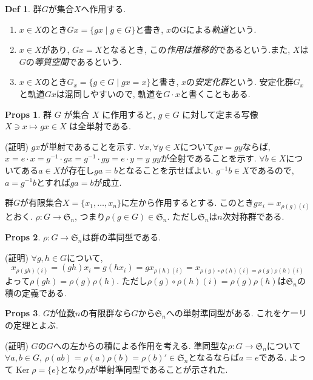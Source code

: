 \documentclass[dvipdfmx]{jsarticle}
\theoremstyle{definition}
\newtheorem{props}{Props}
\newtheorem{definition}{Def}
\numberwithin{equation}{section}
\numberwithin{props}{section}
\numberwithin{definition}{section}
\numberwithin{note}{section}
\DeclareMathOperator{\Ker}{Ker}
\begin{document}
\begin{definition}
     群$G$が集合$X$へ作用する.
     \begin{enumerate}
          \item $x\in X$のとき$Gx=\lbrace gx\mid g\in G\rbrace$と書き, $x$のGによる\emph{軌道}という.
          \item $x\in X$があり, $Gx=X$となるとき, この\emph{作用は推移的}であるという.また, $X$は$G$の\emph{等質空間}であるという.
          \item $x\in X$のとき$G_x=\lbrace g\in G\mid gx=x\rbrace$と書き, $x$の\emph{安定化群}という. 安定化群$G_x$と軌道$Gx$は混同しやすいので, 軌道を$G\cdot x$と書くこともある.
     \end{enumerate}
\end{definition}

\begin{props}
     群 $G$ が集合 $X$ に作用すると, $g\in G$ に対して定まる写像 $X\ni x\mapsto gx\in X$ は全単射である.
\end{props}
(証明)
$gx$が単射であることを示す.
$\forall x,\forall y\in X$について$gx =gy$ならば, $x=e\cdot x=g^{-1}\cdot gx = g^{-1}\cdot gy=e\cdot y=y$
$gy$が全射であることを示す.
$\forall b\in X$についてある$a\in X$が存在し$ga=b$となることを示せばよい. $g^{-1}b \in X$であるので, $a=g^{-1}b$とすれば$ga=b$が成立.


$群G$が有限集合$X=\lbrace x_1,\ldots,x_n\rbrace$に左から作用するとする. このとき$gx_i=x_{\rho(g)(i)}$とおく. $\rho : G\to \mathfrak{S}_n$, つまり$\rho(g\in G)\in \mathfrak{S}_n$. ただし$\mathfrak{S}_n$は$n$次対称群である.
\begin{props}
     $\rho:G\to \mathfrak{S}_n$は群の準同型である.
\end{props}
(証明)
$\forall g,h\in G$について,
$$
     x_{\rho(gh)(i)}=(gh)x_i=g(hx_i)=gx_{\rho(h)(i)}=x_{\rho(g)\circ\rho(h)(i)=\rho(g)\rho(h)(i)}
$$
よって$\rho(gh)=\rho(g)\rho(h)$. ただし$\rho(g)\circ\rho(h)(i)=\rho(g)\rho(h)$は$\mathfrak{S}_n$の積の定義である.

\begin{props}
     $G$が位数$n$の有限群なら$G$から$\mathfrak{S}_n$への単射準同型がある. これをケーリの定理とよぶ.
\end{props}
(証明) $G$の$G$への左からの積による作用を考える. 準同型な$\rho:G\to \mathfrak{S}_n$について$\forall a,b \in G$, $\rho(ab)=\rho(a)\rho(b)=\rho(b)'\in \mathfrak{S}_n$となるならば$a=e$である. よって$\Ker \rho=\lbrace e\rbrace$となり$\rho$が単射準同型であることが示された.
\end{document}
